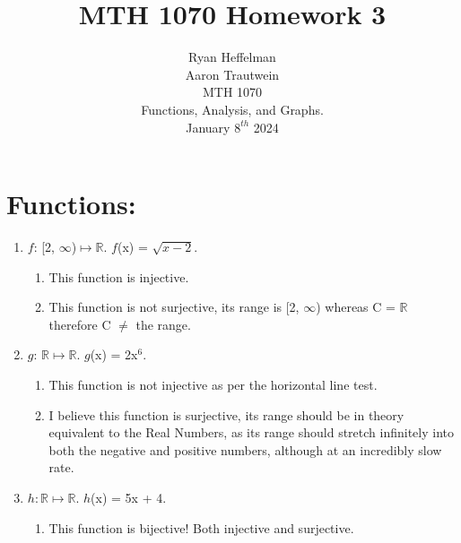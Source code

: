 \documentclass[16pt]{article}
\begin{document}
\Large
\date{}
\title{\LARGE MTH 1070 Homework 3}
\author{\LARGE Ryan Heffelman\\\LARGE Aaron Trautwein \\\LARGE 
MTH 1070 \\\LARGE Functions, Analysis, and Graphs. \\\LARGE January \(8^{th}\) 2024} 
\maketitle

\section{Functions: }
\begin{enumerate}
    \item \(f\): [2, \(\infty\))\(\mapsto\)$\mathbb{R}$. \(f\)(x) = \(\sqrt{x - 2}\).
    \begin{enumerate}
        \item This function is injective.
        \item This function is not surjective, its range is [2, \(\infty\)) whereas C = $\mathbb{R}$ therefore C \(\neq\) the range.
    \end{enumerate}
    \item \(g\): $\mathbb{R}$\(\mapsto\)$\mathbb{R}$. \(g\)(x) = 2x\(^6\).
    \begin{enumerate}
        \item This function is not injective as per the horizontal line test.
        \item I believe this function is surjective, its range should be in theory equivalent to the Real Numbers, as its range should stretch infinitely into both the negative and positive numbers, although at an incredibly slow rate.
    \end{enumerate}
    \item \(h: \mathbb{R}\mapsto\mathbb{R}\). \(h\)(x) = 5x + 4.
    \begin{enumerate}
        \item This function is bijective! Both injective and surjective.
    \end{enumerate}
\end{enumerate}
\end{document}
